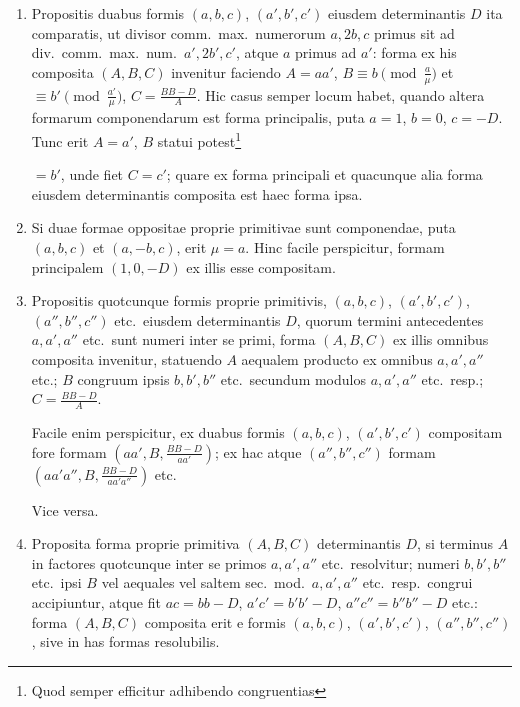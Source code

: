 \documentclass[12pt,a4paper]{article}
\theoremstyle{plain}
\theoremstyle{definition}
\theoremstyle{remark}
\theoremstyle{problemstyle}
\begin{document}
\begin{enumerate}[label=\arabic*)]
\item Propositis duabus formis $(a, b, c)$, $(a', b', c')$ eiusdem determinantis $D$ ita comparatis, ut divisor comm.\ max.\ numerorum $a, 2b, c$ primus sit ad div.\ comm.\ max.\ num.\ $a', 2b', c'$, atque $a$ primus ad $a'$: forma ex his composita $(A, B, C)$ invenitur faciendo $A = aa'$, $B \equiv b \pmod{\tfrac{a}{\mu}}$ et $\equiv b' \pmod{\tfrac{a'}{\mu}}$, $C = \frac{BB - D}{A}$. Hic casus semper locum habet, quando altera formarum componendarum est forma principalis, puta $a = 1$, $b = 0$, $c = -D$. Tunc erit $A = a'$, $B$ statui potest\footnote{Quod semper efficitur adhibendo congruentias}

$= b'$, unde fiet $C = c'$; quare ex forma principali et quacunque alia forma eiusdem determinantis composita est haec forma ipsa.

\item Si duae formae oppositae proprie primitivae sunt componendae, puta $(a, b, c)$ et $(a, -b, c)$, erit $\mu = a$. Hinc facile perspicitur, formam principalem $(1, 0, -D)$ ex illis esse compositam.

\item Propositis quotcunque formis proprie primitivis, $(a, b, c)$, $(a', b', c')$, $(a'', b'', c'')$ etc.\ eiusdem determinantis $D$, quorum termini antecedentes $a, a', a''$ etc.\ sunt numeri inter se primi, forma $(A, B, C)$ ex illis omnibus composita invenitur, statuendo $A$ aequalem producto ex omnibus $a, a', a''$ etc.; $B$ congruum ipsis $b, b', b''$ etc.\ secundum modulos $a, a', a''$ etc.\ resp.; $C = \frac{BB - D}{A}$.

Facile enim perspicitur, ex duabus formis $(a, b, c)$, $(a', b', c')$ compositam fore formam $(aa', B, \frac{BB - D}{aa'})$; ex hac atque $(a'', b'', c'')$ formam $(aa'a'', B, \frac{BB - D}{aa'a''})$ etc.

Vice versa.

\item Proposita forma proprie primitiva $(A, B, C)$ determinantis $D$, si terminus $A$ in factores quotcunque inter se primos $a, a', a''$ etc.\ resolvitur; numeri $b, b', b''$ etc.\ ipsi $B$ vel aequales vel saltem sec.\ mod.\ $a, a', a''$ etc.\ resp.\ congrui accipiuntur, atque fit $ac = bb - D$, $a'c' = b'b' - D$, $a''c'' = b''b'' - D$ etc.: forma $(A, B, C)$ composita erit e formis $(a, b, c)$, $(a', b', c')$, $(a'', b'', c'')$, sive in has formas resolubilis.


\end{enumerate}
\end{document}
